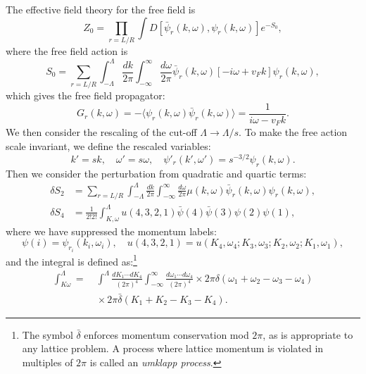 The effective field theory for the free field is
\begin{equation}
	Z_0 = \prod_{r=L/R}\int D\left[\bar\psi_r(k,\omega),\psi_r(k,\omega)\right] e^{-S_0},
\end{equation}
where the free field action is
\begin{equation}
	S_0 = \sum_{r=L/R} \int^\Lambda_{-\Lambda} \frac{dk}{2\pi} \int^\infty_{-\infty} \frac{d\omega}{2\pi} 
	\bar\psi_r(k,\omega)[-i\omega + v_F k]\psi_r(k,\omega),
\end{equation}
which gives the free field propagator:
\begin{equation}
	G_r(k,\omega) = -\langle \psi_r(k,\omega)\bar\psi_r(k,\omega)\rangle 
	= \frac{1}{i\omega - v_F k}.
\end{equation}
We then consider the rescaling of the cut-off $\Lambda \rightarrow \Lambda/s$. 
To make the free action scale invariant, we define the rescaled variables:
\begin{equation}
	k' = sk, \quad \omega' = s\omega, \quad 
	\psi'_r(k',\omega') = s^{-3/2}\psi_r(k,\omega).
\end{equation}
Then we consider the perturbation from quadratic and quartic terms:
\begin{equation}
\begin{aligned}
	\delta S_2 &= \sum_{r=L/R} \int^\Lambda_{-\Lambda}\frac{dk}{2\pi}\int^\infty_{-\infty} \frac{d\omega}{2\pi} 
	\mu(k,\omega) \bar\psi_r(k,\omega) \psi_r(k,\omega), \\
	\delta S_4 &= \frac{1}{2!2!} \int^\Lambda_{K,\omega} 
	u(4,3,2,1)\bar\psi(4)\bar\psi(3)\psi(2)\psi(1),
\end{aligned}
\end{equation}
where we have suppressed the momentum labels: 
\begin{equation}
	\psi(i) = \psi_{r_i}(k_i,\omega_i), \quad
	u(4,3,2,1) = u(K_4,\omega_4;K_3,\omega_3;K_2,\omega_2;K_1,\omega_1),
\end{equation}
and the integral is defined as:\footnote{The symbol $\bar\delta$ enforces momentum conservation mod $2\pi$, as is appropriate to any lattice problem. A process where lattice momentum is violated in multiples of $2\pi$ is called an \textit{umklapp process}.}
\begin{equation}
\begin{aligned}
	\int_{K \omega}^{\Lambda}
	=& \ \int^\Lambda \frac{d K_1 \cdots d K_4}{(2 \pi)^{4}} \int_{-\infty}^{\infty} \frac{d \omega_{1} \cdots d \omega_{4}}{(2 \pi)^{4}} \times 2 \pi \delta\left(\omega_{1}+\omega_{2}-\omega_{3}-\omega_{4}\right) \\
	&\ \times 2 \pi \bar{\delta}(K_1+K_2-K_3-K_4).
\end{aligned}
\end{equation}
